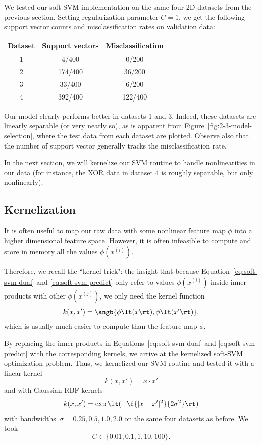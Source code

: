 \documentclass{article}
\newcommand{\sind}[1]{^{(#1)}}
\begin{document}
\begin{multicols}{2}
We tested our soft-SVM implementation
on the same four 2D datasets from the previous section.
Setting regularization parameter $C=1$,
we get the following support vector counts and misclassification rates on validation data:

\begin{center}
\begin{tabular}{|c|c|c|}
\hline
Dataset & Support vectors & Misclassification \\\hline
1 & 4/400 & 0/200 \\
2 & 174/400 & 36/200 \\
3 & 33/400 & 6/200 \\
4 & 392/400 & 122/400\\\hline
\end{tabular}
\end{center}

Our model clearly performs better in datasets 1 and 3.
Indeed, these datasets are linearly separable (or very nearly so),
as is apparent from Figure~\ref{fig:2-3-model-selection},
where the test data from each dataset are plotted.
Observe also that the number of support vector generally tracks the misclassification rate.

In the next section, we will kernelize our SVM routine
to handle nonlinearities in our data
(for instance, the XOR data in dataset 4 is roughly separable, but only nonlinearly).



\subsection{Kernelization}

It is often useful to map our raw data
with some nonlinear feature map $\phi$
into a higher dimensional feature space.
However, it is often infeasible to compute and store in memory
all the values $\phi(x\sind{i})$.

Therefore, we recall the ``kernel trick": the insight that
because Equation~\ref{eq:soft-svm-dual} and \ref{eq:soft-svm-predict}
only refer to values $\phi(x\sind{i})$ inside inner products
with other $\phi(x\sind{j})$,
we only need the kernel function
\begin{equation}
    k(x, x') = \angb{\phi\lt(x\rt), \phi\lt(x'\rt)},
\end{equation}
which is usually much easier to compute than the feature map $\phi$.

By replacing the inner products in
Equations~\ref{eq:soft-svm-dual} and \ref{eq:soft-svm-predict}
with the corresponding kernels,
we arrive at the kernelized soft-SVM optimization problem.
Thus, we kernelized our SVM routine
and tested it with a linear kernel
\begin{equation}
    k(x, x') = x\cdot x'
\end{equation}
and with Gaussian RBF kernels
\begin{equation}
    k(x, x') = \exp\lt(-\f{|x - x'|^2}{2\sigma^2}\rt)
\end{equation}
with bandwidths~$\sigma=0.25,0.5,1.0,2.0$ on the same four datasets as before.
We took
\[
    C \in \{0.01, 0.1, 1, 10, 100\}.
\]


\end{multicols}
\end{document}
